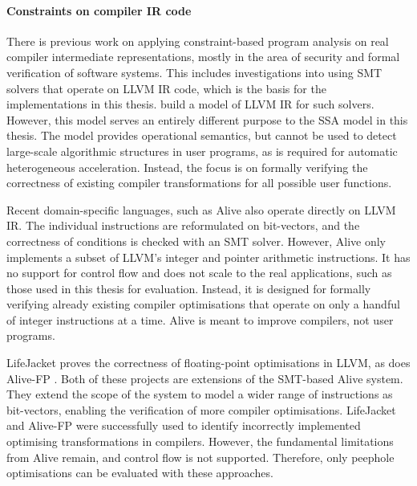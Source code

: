     \paragraph*{Constraints on compiler IR code}
    There is previous work on applying constraint-based program analysis on
    real compiler intermediate representations, mostly in the area of security
    and formal verification of software systems.
    This includes investigations into using SMT solvers that operate on LLVM IR
    code, which is the basis for the implementations in this thesis.
    \citet{Zhao:2012:FLI:2103656.2103709} build a model of LLVM IR for such
    solvers.
    However, this model serves an entirely different purpose to the SSA model
    in this thesis.
    The model provides operational semantics, but cannot be used to detect
    large-scale algorithmic structures in user programs, as is required for
    automatic heterogeneous acceleration.
    Instead, the focus is on formally verifying the correctness of existing
    compiler transformations for all possible user functions.

    Recent domain-specific languages, such as Alive
    \citep{Lopes:2015:PCP:2737924.2737965} also operate directly on LLVM IR.
    The individual instructions are reformulated on bit-vectors, and the
    correctness of conditions is checked with an SMT solver.
    However, Alive only implements a subset of LLVM's integer and pointer
    arithmetic instructions.
    It has no support for control flow and does not scale to the real
    applications, such as those used in this thesis for evaluation.
    Instead, it is designed for formally verifying already existing
    compiler optimisations that operate on only a handful of integer
    instructions at a time.
    Alive is meant to improve compilers, not user programs.

    LifeJacket \citep{Notzli:2016:LVP:2931021.2931024} proves the correctness of
    floating-point optimisations in LLVM, as does Alive-FP \citep{Menendez2016}.
    Both of these projects are extensions of the SMT-based Alive system.
    They extend the scope of the system to model a wider range of
    instructions as bit-vectors, enabling the verification of more compiler
    optimisations.
    LifeJacket and Alive-FP were successfully used to identify incorrectly
    implemented  optimising transformations in compilers.
    However, the fundamental limitations from Alive remain, and control flow is
    not supported.
    Therefore, only peephole optimisations can be evaluated with these
    approaches.

